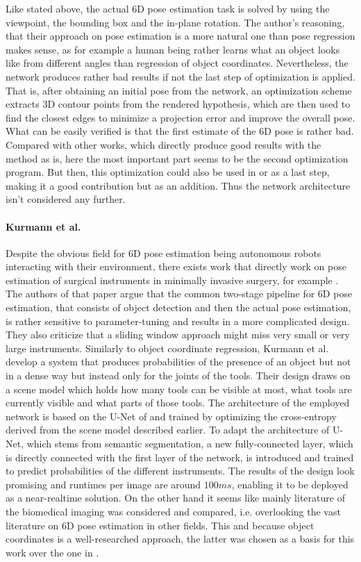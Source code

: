 \nnewline
Like stated above, the actual 6D pose estimation task is solved by using the viewpoint, the bounding box and the in-plane rotation. The author's reasoning, that their approach on pose estimation is a more natural one than pose regression makes sense, as for example a human being rather learns what an object looks like from different angles than regression of object coordinates. Nevertheless, the network produces rather bad results if not the last step of optimization is applied. That is, after obtaining an initial pose from the network, an optimization scheme extracts 3D contour points from the rendered hypothesis, which are then used to find the closest edges to minimize a projection error and improve the overall pose. 
\nnewline
What can be easily verified is that the first estimate of the 6D pose is rather bad. Compared with other works, which directly produce good results with the method as is, here the most important part seems to be the second optimization program. But then, this optimization could also be used in \cite{brachmann2} or \cite{bb8} as a last step, making it a good contribution but as an addition. Thus the network architecture isn't considered any further.

\paragraph{Kurmann et al.}

Despite the obvious field for 6D pose estimation being autonomous robots interacting with their environment, there exists work that directly work on pose estimation of surgical instruments in minimally invasive surgery, for example \cite{kurmann}. The authors of that paper argue that the common two-stage pipeline for 6D pose estimation, that consists of object detection and then the actual pose estimation, is rather sensitive to parameter-tuning and results in a more complicated design. They also criticize that a sliding window approach might miss very small or very large instruments. 
\nnewline
Similarly to object coordinate regression, Kurmann et al. develop a system that produces probabilities of the presence of an object but not in a dense way but instead only for the joints of the tools. Their design draws on a scene model which holds how many tools can be visible at most, what tools are currently visible and what parts of those tools. 
\nnewline
The architecture of the employed network is based on the U-Net of \cite{oronneberger} and trained by optimizing the cross-entropy derived from the scene model described earlier. To adapt the architecture of U-Net, which stems from semantic segmentation, a new fully-connected layer, which is directly connected with the first layer of the network, is introduced and trained to predict probabilities of the different instruments. 
\nnewline
The results of the design look promising and runtimes per image are around $100 ms$, enabling it to be deployed as a near-realtime solution. On the other hand it seems like mainly literature of the biomedical imaging was considered and compared, i.e. overlooking the vast literature on 6D pose estimation in other fields. This and because object coordinates is a well-researched approach, the latter was chosen as a basis for this work over the one in \cite{kurmann}. 

